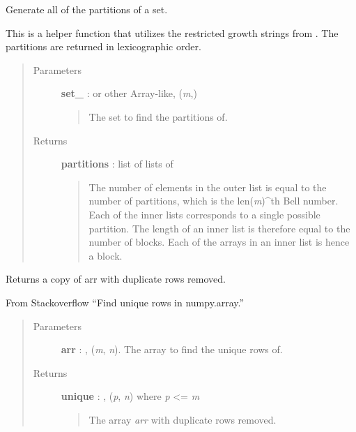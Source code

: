 \documentclass[letterpaper,10pt,english]{sphinxmanual}
\begin{document}
\begin{fulllineitems}
\label{gptools:gptools.utils.generate_set_partitions}
Generate all of the partitions of a set.

This is a helper function that utilizes the restricted growth strings from
{\hyperref[gptools:gptools.utils.generate_set_partition_strings]{}}. The partitions are returned in
lexicographic order.
\begin{quote}\begin{description}
\item[{Parameters }] \leavevmode
\textbf{set\_} :  or other Array-like, (\emph{m},)
\begin{quote}

The set to find the partitions of.
\end{quote}

\item[{Returns }] \leavevmode
\textbf{partitions} : list of lists of 
\begin{quote}

The number of elements in the outer list is equal to the number of
partitions, which is the len(\emph{m})\textasciicircum{}th Bell number. Each of the inner lists
corresponds to a single possible partition. The length of an inner list
is therefore equal to the number of blocks. Each of the arrays in an
inner list is hence a block.
\end{quote}

\end{description}\end{quote}

\end{fulllineitems}


\begin{fulllineitems}
\label{gptools:gptools.utils.unique_rows}
Returns a copy of arr with duplicate rows removed.

From Stackoverflow ``Find unique rows in numpy.array.''
\begin{quote}\begin{description}
\item[{Parameters }] \leavevmode
\textbf{arr} : , (\emph{m}, \emph{n}). The array to find the unique rows of.

\item[{Returns }] \leavevmode
\textbf{unique} : , (\emph{p}, \emph{n}) where \emph{p} \textless{}= \emph{m}
\begin{quote}

The array \emph{arr} with duplicate rows removed.
\end{quote}

\end{description}\end{quote}

\end{fulllineitems}
\end{document}
